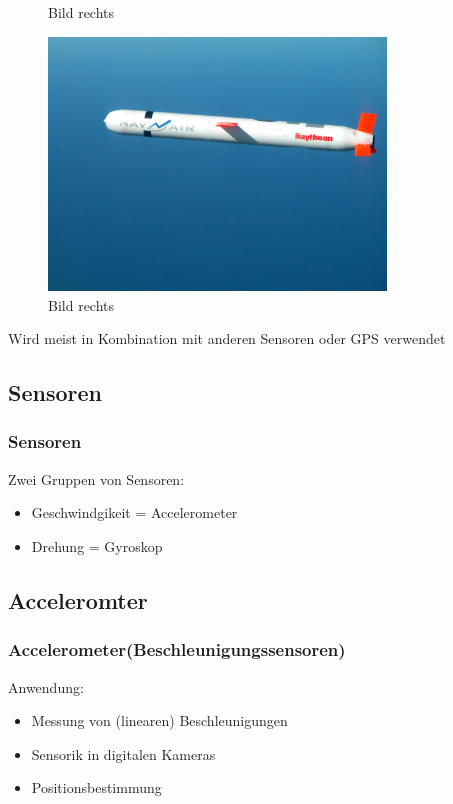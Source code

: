 \documentclass[10pt,a4paper,oneside]{beamer}
\begin{document}
\begin{frame}
\begin{figure}[htbp]
\begin{minipage}{0.3\textwidth}
        \caption{Bild rechts}
      \end{minipage}\hfill
      \begin{minipage}{0.3\textwidth}
       \centering
        \includegraphics[width=0.8\textwidth]{images/cruise_missle.jpg}
        \caption{Bild rechts}
      \end{minipage}
    \end{figure}
    Wird meist in Kombination mit anderen Sensoren oder GPS verwendet
\end{frame}

\begin{frame}
	\section{Sensoren}
	\frametitle{Sensoren}
	Zwei Gruppen von Sensoren:
	\begin{itemize}
		\item Geschwindgikeit = Accelerometer
		\item Drehung = Gyroskop
	\end{itemize}

\end{frame}

\begin{frame}
  \subsection{Acceleromter}
  \frametitle{Accelerometer(Beschleunigungssensoren)}
  
  Anwendung:
  \begin{itemize}
    \item Messung von (linearen) Beschleunigungen
  	\item Sensorik in digitalen Kameras
  	\item Positionsbestimmung
  \end{itemize}
\end{frame}
\end{document}
